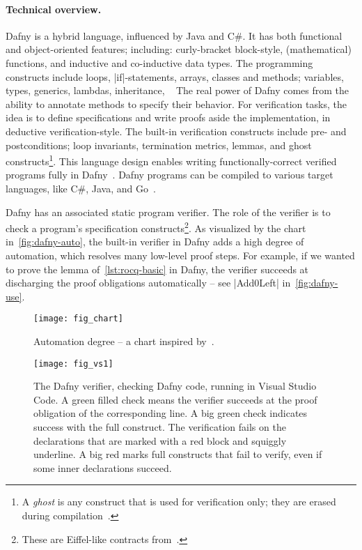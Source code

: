 \paragraph*{Technical overview.}
Dafny is a hybrid language, influenced by Java and C\#.
It has both functional and object-oriented features;
including: curly-bracket block-style, (mathematical) functions, and inductive and co-inductive data types.
The programming constructs include loops, \pr|if|-statements, arrays, classes and methods;
variables, types, generics, lambdas, inheritance, \etc~\cite{dafnydoc}
The real power of Dafny comes from the ability to annotate methods to specify their behavior.
For verification tasks, the idea is to define specifications and write proofs aside the implementation, in deductive verification-style.
The built-in verification constructs include pre- and postconditions;
loop invariants, termination metrics, lemmas, and ghost constructs\footnote{
A \emph{ghost} is any construct that is used for verification only; they are erased during compilation~\cite[p. 19]{leino2023}.}.
This language design enables writing functionally-correct verified programs fully in Dafny~\cite{leino2023}.
Dafny programs can be compiled to various target languages, like C\#, Java, and Go~\cite{dafnydoc}.

Dafny has an associated static program verifier.
The role of the verifier is to check a program's specification constructs\footnote{These are Eiffel-like contracts from~\cite{meyer1988}.}.
As visualized by the chart in~\autoref{fig:dafny-auto},
the built-in verifier in Dafny adds a high degree of automation, which resolves many low-level proof steps.
For example, if we wanted to prove the lemma of~\autoref{lst:rocq-basic} in Dafny, the verifier succeeds at discharging the proof obligations automatically -- see \pr|Add0Left| in~\autoref{fig:dafny-use}.

\begin{figure}[ht]
\centering
\texttt{[image: fig\_chart]}
\caption{Automation degree -- a chart inspired by~\cite{leino2010b}.}
\label{fig:dafny-auto}
\end{figure}

\begin{figure}[p]
\begin{center}
\texttt{[image: fig\_vs1]}
\end{center}
\caption[Dafny running in Visual Studio Code]
{The Dafny verifier, checking Dafny code, running in Visual Studio Code.
A green filled check {\color{dafnyok}{\scalebox{.8}{\faCheckCircle}}}
means the verifier succeeds at the proof obligation of the corresponding line.
A big green check{ }{ }\circled[dafnyok]{\faCheck}{ }indicates success with the full construct.
The verification fails on the declarations that are marked with a red block and squiggly underline.
A big red{ }{ }\circled[dafnyno]{\faTimes}{ }marks full constructs that fail to verify, even if some inner declarations succeed.}
\label{fig:dafny-use}
\end{figure}

